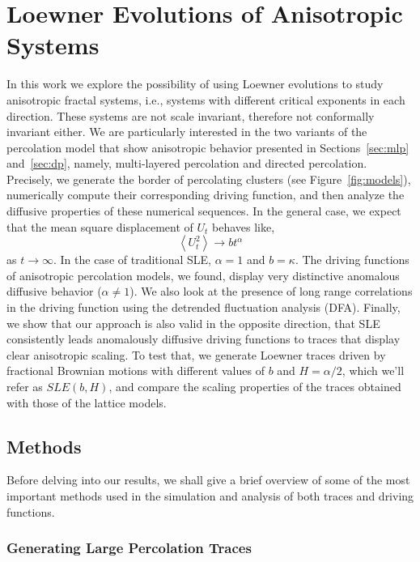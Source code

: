 \chapter{Loewner Evolutions of Anisotropic Systems}
\label{ch:asle}

In this work we explore the possibility of using Loewner evolutions to study
anisotropic fractal systems, i.e., systems with different critical exponents in
each direction. These systems are not scale invariant, therefore not
conformally invariant either. We are particularly interested in the two
variants of the percolation model that show anisotropic behavior presented in
Sections~\ref{sec:mlp} and~\ref{sec:dp}, namely, multi-layered percolation and
directed percolation. Precisely,  we generate the border of percolating
clusters (see Figure~\ref{fig:models}), numerically compute their corresponding
driving function, and then analyze the diffusive properties of these numerical
sequences. In the general case, we expect that the mean square displacement of
$U_t$ behaves like,
\begin{equation}
    \label{eq:diff}
    \left\langle U_t^2 \right\rangle \rightarrow b t^\alpha
\end{equation} 
as $t\rightarrow\infty$. In the case of traditional SLE, $\alpha=1$ and
$b=\kappa$.  The driving functions of anisotropic percolation models, we found,
display very distinctive anomalous diffusive behavior ($\alpha\neq1$). We also
look at the presence of long range correlations in the driving function using
the detrended fluctuation analysis (DFA). Finally, we show that our approach is
also valid in the opposite direction, that SLE consistently leads
anomalously diffusive driving functions to traces that display clear
anisotropic scaling. To test that, we generate Loewner traces driven by
fractional Brownian motions with different values of $b$ and $H=\alpha/2$,
which we'll refer as $SLE(b,H)$, and compare the scaling properties of the
traces obtained with those of the lattice models.


\section{Methods}
\label{sec:methods}

Before delving into our results, we shall give a brief overview of some of the
most important methods used in the simulation and analysis of both traces
and driving functions.

\subsection{Generating Large Percolation Traces}
\label{sec:hulls}

